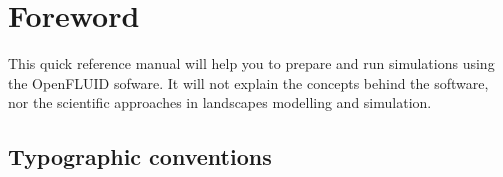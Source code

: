 \chapter*{Foreword}

This quick reference manual will help you to prepare and run simulations using
the OpenFLUID sofware. It will not explain the concepts behind the software, nor the
scientific approaches in landscapes modelling and simulation. 

\section*{Typographic conventions}




